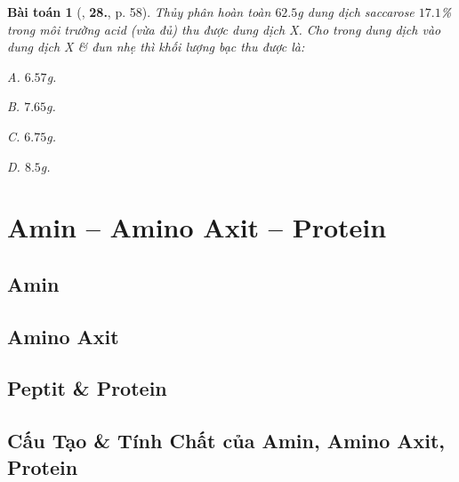 \documentclass{article}
\numberwithin{equation}{section}
\newtheorem{baitoan}{Bài toán}[section]
\begin{document}
\begin{baitoan}[\cite{An2008}, \textbf{28.}, p. 58]
	Thủy phân hoàn toàn $62.5$\emph{g} dung dịch saccarose $17.1$\% trong môi trường acid (vừa đủ) thu được dung dịch X. Cho \emph{} trong dung dịch \emph{} vào dung dịch X \& đun nhẹ thì khối lượng bạc thu được là:
	\begin{enumerate*}
		\item[{\rm\sf A.}] $6.57$\emph{g}.
		\item[{\rm\sf B.}] $7.65$\emph{g}.
		\item[{\rm\sf C.}] $6.75$\emph{g}.
		\item[{\rm\sf D.}] $8.5$\emph{g}.
	\end{enumerate*}
\end{baitoan}


\section{Amin -- Amino Axit -- Protein}

\subsection{Amin}


\subsection{Amino Axit}


\subsection{Peptit \& Protein}


\subsection{Cấu Tạo \& Tính Chất của Amin, Amino Axit, Protein}

\end{document}
